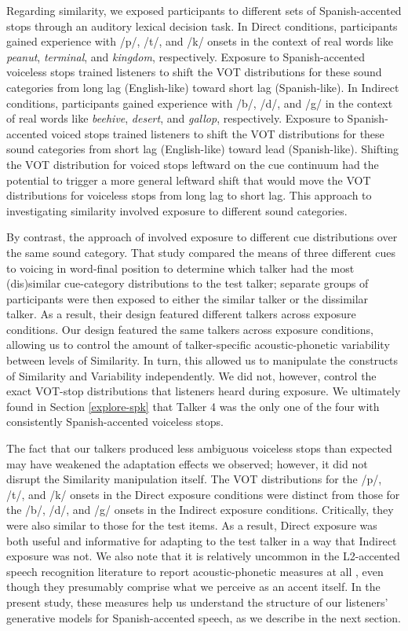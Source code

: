 \documentclass[preprint, 3p, authoryear]{elsarticle} %
\begin{document}
Regarding similarity, we exposed participants to different sets of Spanish-accented stops through an auditory lexical decision task.
In Direct conditions, participants gained experience with /p/, /t/, and /k/ onsets in the context of real words like \emph{peanut}, \emph{terminal}, and \emph{kingdom}, respectively.
Exposure to Spanish-accented voiceless stops trained listeners to shift the VOT distributions for these sound categories from long lag (English-like) toward short lag (Spanish-like).
In Indirect conditions, participants gained experience with /b/, /d/, and /g/ in the context of real words like \emph{beehive}, \emph{desert}, and \emph{gallop}, respectively.
Exposure to Spanish-accented voiced stops trained listeners to shift the VOT distributions for these sound categories from short lag (English-like) toward lead (Spanish-like).
Shifting the VOT distribution for voiced stops leftward on the cue continuum had the potential to trigger a more general leftward shift that would move the VOT distributions for voiceless stops from long lag to short lag.
This approach to investigating similarity involved exposure to different sound categories.

By contrast, the approach of \citet{xie2017similarity} involved exposure to different cue distributions over the same sound category.
That study compared the means of three different cues to voicing in word-final position to determine which talker had the most (dis)similar cue-category distributions to the test talker; separate groups of participants were then exposed to either the similar talker or the dissimilar talker.
As a result, their design featured different talkers across exposure conditions.
Our design featured the same talkers across exposure conditions, allowing us to control the amount of talker-specific acoustic-phonetic variability between levels of Similarity.
In turn, this allowed us to manipulate the constructs of Similarity and Variability independently.
We did not, however, control the exact VOT-stop distributions that listeners heard during exposure.
We ultimately found in Section \ref{explore-spk} that Talker 4 was the only one of the four with consistently Spanish-accented voiceless stops.

The fact that our talkers produced less ambiguous voiceless stops than expected may have weakened the adaptation effects we observed; however, it did not disrupt the Similarity manipulation itself.
The VOT distributions for the /p/, /t/, and /k/ onsets in the Direct exposure conditions were distinct from those for the /b/, /d/, and /g/ onsets in the Indirect exposure conditions.
Critically, they were also similar to those for the test items.
As a result, Direct exposure was both useful and informative for adapting to the test talker in a way that Indirect exposure was not.
We also note that it is relatively uncommon in the L2-accented speech recognition literature to report acoustic-phonetic measures at all \citetext{\citealp[cf.][]{xie2021}; \citealp[@][]{alexander2019}}, even though they presumably comprise what we perceive as an accent itself.
In the present study, these measures help us understand the structure of our listeners' generative models for Spanish-accented speech, as we describe in the next section.
\end{document}
